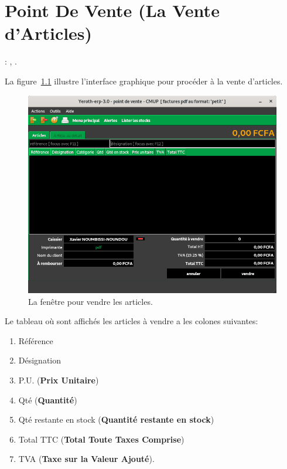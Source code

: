 \chapter{Point De Vente (La Vente d'Articles)}\label{chap:vendre}

\utilisateurs: \liencaissier, \lienpatron.\\


\label{sec:vendre-introduction}

La figure~\ref{fig:fenetre-vendre} illustre
l'interface graphique pour proc\'eder \`a la
vente d'articles.

\begin{figure}[!htbp]
	\centering
	\includegraphics[scale=0.63]{images/yeren-fenetre-caissier.png}
	\caption{La fen\^etre pour vendre les articles.}
	\label{fig:fenetre-vendre}
\end{figure}

Le tableau o\`u sont affich\'es les articles \`a vendre
a les colones suivantes:
\begin{enumerate}[1)]
	\item R\'ef\'erence
	\item D\'esignation
	\item P.U. (\textbf{Prix Unitaire})
	\item Qt\'e (\textbf{Quantit\'e})
	\item Qt\'e restante en stock (\textbf{Quantit\'e restante en stock})
	\item Total TTC (\textbf{Total Toute Taxes Comprise})	
	\item TVA (\textbf{Taxe sur la Valeur Ajout\'e}).
\end{enumerate}

